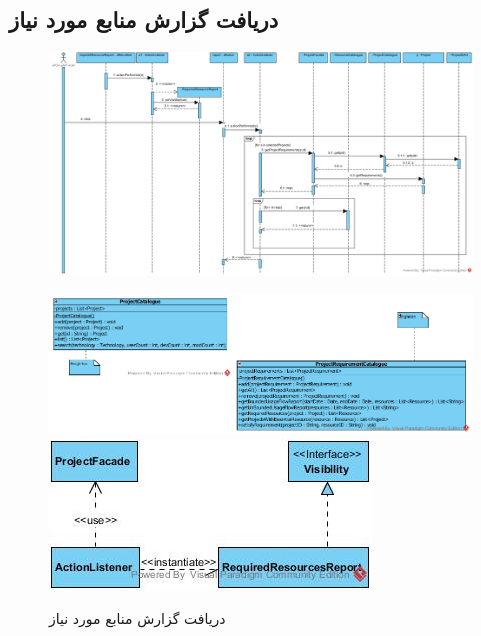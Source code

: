 \begin{landscape}
\newpage
\section{دریافت گزارش منابع مورد نیاز}
\begin{figure}[H]
	\centering
	\includegraphics[scale=0.6]{img/sequence-design/RequiredResourcesReport}
\end{figure}
\begin{figure}[H]
	\centering
	\includegraphics[scale=0.7]{img/sequence-design/RequiredResourcesReportC}
	\includegraphics[scale=0.7]{img/sequence-design/RequiredResourcesReportUI}
	\caption{دریافت گزارش منابع مورد نیاز}
\end{figure}

\newpage

\end{landscape}
